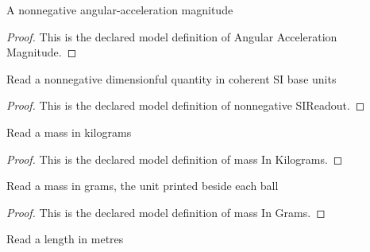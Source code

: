 \begin{definition}
  \label{def:physics:phyx-mini-0910:phyxminiproblems-problemphyxmini0910-angularaccelerationmagnitude}
  A nonnegative angular-acceleration magnitude
\end{definition}
\begin{proof}
  This is the declared model definition of Angular Acceleration Magnitude.
\end{proof}
\begin{definition}
  \label{def:physics:phyx-mini-0910:phyxminiproblems-problemphyxmini0910-nonnegativesireadout}
  Read a nonnegative dimensionful quantity in coherent SI base units
\end{definition}
\begin{proof}
  This is the declared model definition of nonnegative SIReadout.
\end{proof}
\begin{definition}
  \label{def:physics:phyx-mini-0910:phyxminiproblems-problemphyxmini0910-massinkilograms}
  Read a mass in kilograms
\end{definition}
\begin{proof}
  This is the declared model definition of mass In Kilograms.
\end{proof}
\begin{definition}
  \label{def:physics:phyx-mini-0910:phyxminiproblems-problemphyxmini0910-massingrams}
  Read a mass in grams, the unit printed beside each ball
\end{definition}
\begin{proof}
  This is the declared model definition of mass In Grams.
\end{proof}
\begin{definition}
  \label{def:physics:phyx-mini-0910:phyxminiproblems-problemphyxmini0910-lengthinmeters}
  Read a length in metres
\end{definition}
